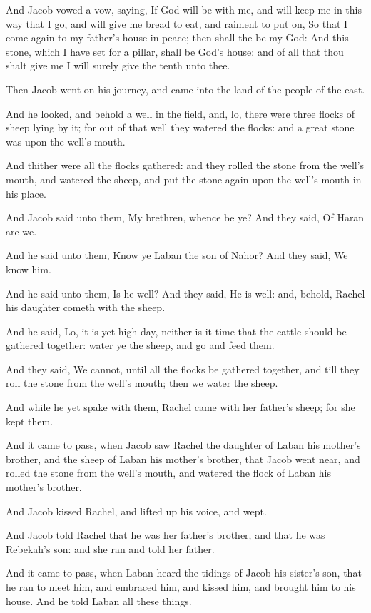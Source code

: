 \Verse And Jacob vowed a vow, saying, If God will be with me, and will keep me in this way that I go, and will give me bread to eat, and raiment to put on, \Verse So that I come again to my father's house in peace; then shall the \LORD be my God: \Verse And this stone, which I have set for a pillar, shall be God's house: and of all that thou shalt give me I will surely give the tenth unto thee.

\Chapter
\Verse Then Jacob went on his journey, and came into the land of the people of the east.

\Verse And he looked, and behold a well in the field, and, lo, there were three flocks of sheep lying by it; for out of that well they watered the flocks: and a great stone was upon the well's mouth.

\Verse And thither were all the flocks gathered: and they rolled the stone from the well's mouth, and watered the sheep, and put the stone again upon the well's mouth in his place.

\Verse And Jacob said unto them, My brethren, whence be ye? And they said, Of Haran are we.

\Verse And he said unto them, Know ye Laban the son of Nahor? And they said, We know him.

\Verse And he said unto them, Is he well? And they said, He is well: and, behold, Rachel his daughter cometh with the sheep.

\Verse And he said, Lo, it is yet high day, neither is it time that the cattle should be gathered together: water ye the sheep, and go and feed them.

\Verse And they said, We cannot, until all the flocks be gathered together, and till they roll the stone from the well's mouth; then we water the sheep.

\Verse And while he yet spake with them, Rachel came with her father's sheep; for she kept them.

\Verse And it came to pass, when Jacob saw Rachel the daughter of Laban his mother's brother, and the sheep of Laban his mother's brother, that Jacob went near, and rolled the stone from the well's mouth, and watered the flock of Laban his mother's brother.

\Verse And Jacob kissed Rachel, and lifted up his voice, and wept.

\Verse And Jacob told Rachel that he was her father's brother, and that he was Rebekah's son: and she ran and told her father.

\Verse And it came to pass, when Laban heard the tidings of Jacob his sister's son, that he ran to meet him, and embraced him, and kissed him, and brought him to his house. And he told Laban all these things.

